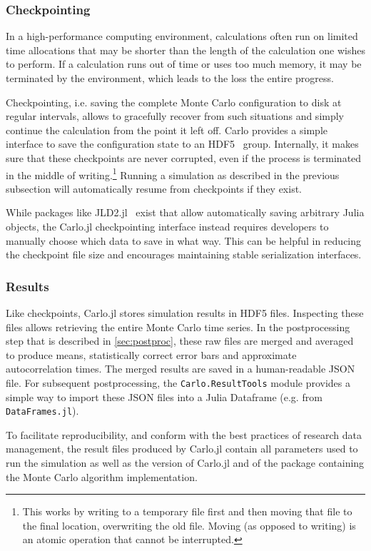 \documentclass{SciPost}
\begin{document}
\subsubsection{Checkpointing}
In a high-performance computing environment, calculations often run on limited time allocations that may be shorter than the length of the calculation one wishes to perform. If a calculation runs out of time or uses too much memory, it may be terminated by the environment, which leads to the loss the entire progress.

Checkpointing, i.e. saving the complete Monte Carlo configuration to disk at regular intervals, allows to gracefully recover from such situations and simply continue the calculation from the point it left off. Carlo provides a simple interface to save the configuration state to an HDF5~\cite{HDF5, HDF5jl} group. Internally, it makes sure that these checkpoints are never corrupted, even if the process is terminated in the middle of writing.\footnote{This works by writing to a temporary file first and then moving that file to the final location, overwriting the old file. Moving (as opposed to writing) is an atomic operation that cannot be interrupted.} Running a simulation as described in the previous subsection will automatically resume from checkpoints if they exist.

While packages like JLD2.jl~\cite{JLD2} exist that allow automatically saving arbitrary Julia objects, the Carlo.jl checkpointing interface instead requires developers to manually choose which data to save in what way. This can be helpful in reducing the checkpoint file size and encourages maintaining stable serialization interfaces.
\subsubsection{Results}
Like checkpoints, Carlo.jl stores simulation results in HDF5 files. Inspecting these files allows retrieving the entire Monte Carlo time series. In the postprocessing step that is described in \cref{sec:postproc}, these raw files are merged and averaged to produce means, statistically correct error bars and approximate autocorrelation times. The merged results are saved in a human-readable JSON file. For subsequent postprocessing, the \texttt{Carlo.ResultTools} module provides a simple way to import these JSON files into a Julia Dataframe (e.g. from \texttt{DataFrames.jl}\cite{BouchetValat2023}).

To facilitate reproducibility, and conform with the best practices of research data management, the result files produced by Carlo.jl contain all parameters used to run the simulation as well as the version of Carlo.jl and of the package containing the Monte Carlo algorithm implementation.
\end{document}
